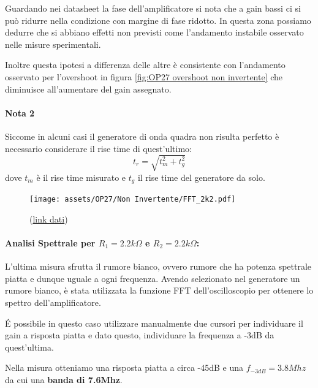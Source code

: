 \begin{flushleft}
    

\colorbox{notebox}{
\begin{minipage}[]{\textwidth}
Guardando nei datasheet la fase dell'amplificatore si nota che a gain bassi ci si può ridurre nella condizione con margine di fase ridotto. In questa zona possiamo dedurre che si abbiano effetti non previsti come l'andamento instabile osservato nelle misure sperimentali.

Inoltre questa ipotesi a differenza delle altre è consistente con l'andamento osservato per l'overshoot in figura \ref{fig:OP27 overshoot non invertente} che diminuisce all'aumentare del gain assegnato.
\end{minipage}
}
\end{flushleft}
\paragraph{Nota 2}
Siccome in alcuni casi il generatore di onda quadra non risulta perfetto è necessario considerare il rise time di quest'ultimo:
\[t_r = \sqrt{t_m^2 + t_g^2}\]
dove $t_m$ è il rise time misurato e $t_g$ il rise time del generatore da solo.

\pagebreak

\begin{figure}
    \centering
    \texttt{[image: assets/OP27/Non Invertente/FFT\_2k2.pdf]}
    \caption{ (\href{https://github.com/Yedi278/Esperimentazioni-Elettronica/tree/main/-\%20OPAMP/OP27/Non-Invertente/R1\%3D2.2k\%2CR2\%3D2.2k}{link dati})}    
\end{figure}

\paragraph{Analisi Spettrale per  $R_1=2.2k\Omega$ e $R_2=2.2k\Omega$:}
L'ultima misura sfrutta il rumore bianco, ovvero rumore che ha potenza spettrale piatta e dunque uguale a ogni frequenza.
Avendo selezionato nel generatore un rumore bianco, è stata utilizzata la funzione FFT dell'oscilloscopio per ottenere lo spettro dell'amplificatore.





\'E possibile in questo caso utilizzare manualmente due cursori per individuare il gain a risposta piatta e dato questo, individuare la frequenza a -3dB da quest'ultima.


 Nella misura otteniamo una risposta piatta a circa -45dB e una $f_{-3dB} = 3.8Mhz$ da cui una \textbf{banda di 7.6Mhz}.

